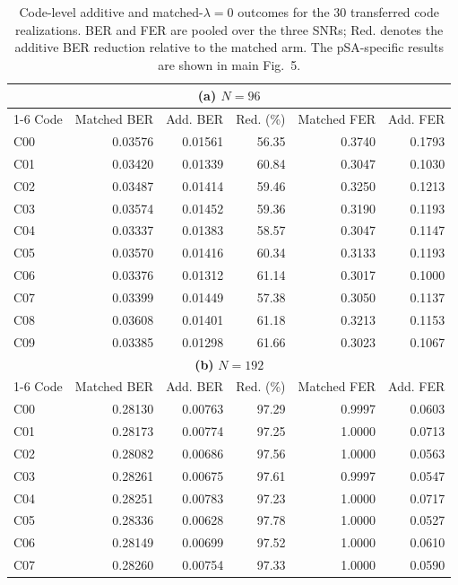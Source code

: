 \documentclass[aps,prapplied,preprint,superscriptaddress,longbibliography,floatfix]{revtex4-2}
\begin{document}
\clearpage
\begingroup
\small
\setlength{\tabcolsep}{5pt}
\renewcommand{\arraystretch}{1.05}
\begin{longtable}{lrrrrr}
\caption{Code-level additive and matched-$\lambda=0$ outcomes for the 30 transferred code realizations.  BER and FER are pooled over the three SNRs; Red. denotes the additive BER reduction relative to the matched arm.  The pSA-specific results are shown in main Fig.~5.}
\label{tabS:codes}\\
\toprule
\multicolumn{6}{c}{\textbf{(a)} $N=96$} \\
\cmidrule(lr){1-6}
Code & Matched BER & Add. BER & Red. (\%) & Matched FER & Add. FER \\
\midrule
C00 & 0.03576 & 0.01561 & 56.35 & 0.3740 & 0.1793 \\
C01 & 0.03420 & 0.01339 & 60.84 & 0.3047 & 0.1030 \\
C02 & 0.03487 & 0.01414 & 59.46 & 0.3250 & 0.1213 \\
C03 & 0.03574 & 0.01452 & 59.36 & 0.3190 & 0.1193 \\
C04 & 0.03337 & 0.01383 & 58.57 & 0.3047 & 0.1147 \\
C05 & 0.03570 & 0.01416 & 60.34 & 0.3133 & 0.1193 \\
C06 & 0.03376 & 0.01312 & 61.14 & 0.3017 & 0.1000 \\
C07 & 0.03399 & 0.01449 & 57.38 & 0.3050 & 0.1137 \\
C08 & 0.03608 & 0.01401 & 61.18 & 0.3213 & 0.1153 \\
C09 & 0.03385 & 0.01298 & 61.66 & 0.3023 & 0.1067 \\
\midrule
\multicolumn{6}{c}{\textbf{(b)} $N=192$} \\
\cmidrule(lr){1-6}
Code & Matched BER & Add. BER & Red. (\%) & Matched FER & Add. FER \\
\midrule
C00 & 0.28130 & 0.00763 & 97.29 & 0.9997 & 0.0603 \\
C01 & 0.28173 & 0.00774 & 97.25 & 1.0000 & 0.0713 \\
C02 & 0.28082 & 0.00686 & 97.56 & 1.0000 & 0.0563 \\
C03 & 0.28261 & 0.00675 & 97.61 & 0.9997 & 0.0547 \\
C04 & 0.28251 & 0.00783 & 97.23 & 1.0000 & 0.0717 \\
C05 & 0.28336 & 0.00628 & 97.78 & 1.0000 & 0.0527 \\
C06 & 0.28149 & 0.00699 & 97.52 & 1.0000 & 0.0610 \\
C07 & 0.28260 & 0.00754 & 97.33 & 1.0000 & 0.0590 \\

\end{longtable}
\end{document}
